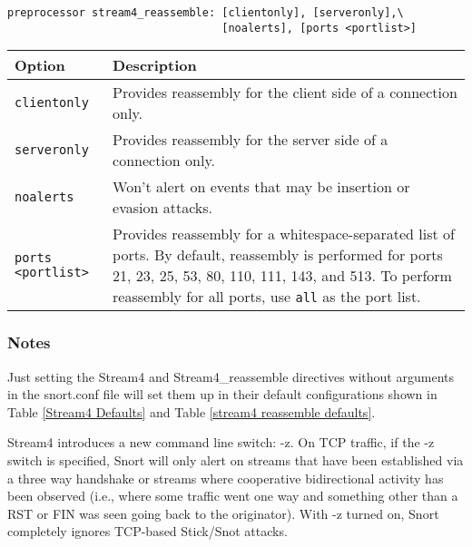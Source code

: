 \documentclass[english]{report}
\begin{document}
\begin{verbatim}
preprocessor stream4_reassemble: [clientonly], [serveronly],\
                                 [noalerts], [ports <portlist>]
\end{verbatim}
\begin{tabular}{| l | p{5in} |}
\hline
\textbf{Option} & \textbf{Description}\\
\hline
\hline
\texttt{clientonly} & Provides reassembly for the client side of a connection
only.\\
\hline
\texttt{serveronly} & Provides reassembly for the server side of a connection
only.\\
\hline
\texttt{noalerts} & Won't alert on events that may be insertion or evasion
attacks.\\
\hline
\texttt{ports <portlist>} & Provides reassembly for a whitespace-separated list of ports. 
By default, reassembly is performed for ports 21, 23, 25, 53, 
80, 110, 111, 143, and 513. To perform reassembly for all ports, use \texttt{all} 
as the port list.\\
\hline
\end{tabular}

\subsubsection{Notes}

Just setting the Stream4 and Stream4\_reassemble directives without
arguments in the snort.conf file will set them up in their default
configurations shown in Table \ref{Stream4 Defaults} and Table \ref{stream4 reassemble defaults}.

Stream4 introduces a new command line switch: -z.
On TCP traffic, if the -z switch is specified, Snort will only alert
on streams that have been established via a three way handshake or
streams where cooperative bidirectional activity has been observed
(i.e., where some traffic went one way and something other than a RST
or FIN was seen going back to the originator). With -z
turned on, Snort completely ignores TCP-based Stick/Snot attacks.
\end{document}

